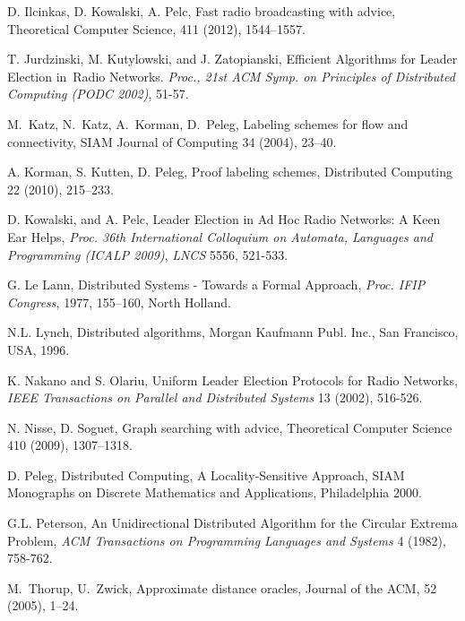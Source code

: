 \documentclass[11pt]{article}
\begin{document}
\begin{thebibliography}{12}
D. Ilcinkas, D. Kowalski, A. Pelc, 
Fast radio broadcasting with advice, 
 Theoretical Computer Science, 411 (2012),  1544--1557.
 
T. Jurdzinski, M. Kutylowski, and J. Zatopianski, 
Efficient Algorithms for Leader Election in~Radio Networks.
 {\em Proc., 21st ACM Symp. on Principles of Distributed Computing
(PODC 2002)}, 51-57.





M.~Katz, N.~Katz, A.~Korman, D.~Peleg, Labeling schemes for flow and
connectivity, 
SIAM Journal of  Computing 34 (2004), 23--40.



A. Korman, S. Kutten, D. Peleg, Proof labeling schemes,
Distributed Computing 22 (2010), 215--233.  

D. Kowalski, and A. Pelc, Leader Election in Ad Hoc Radio Networks: A Keen Ear Helps, 
{\em Proc. 36th International Colloquium on Automata, Languages and Programming (ICALP 2009)}, 
{\em LNCS} 5556, 521-533. 



G. Le Lann,
Distributed Systems - Towards a Formal Approach,
{\em Proc. IFIP Congress}, 1977, 155--160, North Holland.




N.L. Lynch, Distributed algorithms, Morgan Kaufmann Publ. Inc.,
San Francisco, USA, 1996.

K. Nakano and S. Olariu, Uniform Leader Election Protocols for Radio Networks,
{\em IEEE Transactions on Parallel and Distributed Systems} 13
(2002), 516-526.

N. Nisse, D. Soguet, Graph searching with advice,
Theoretical Computer Science 410 (2009), 1307--1318.



 D. Peleg,
  Distributed Computing, A Locality-Sensitive Approach,
  SIAM Monographs on Discrete Mathematics and Applications, Philadelphia 2000.
  
G.L. Peterson, An  Unidirectional Distributed Algorithm
for the Circular Extrema Problem,
{\em ACM Transactions on Programming Languages and Systems} 4 (1982), 758-762.








M.~Thorup, U.~Zwick, Approximate distance oracles,
Journal of the ACM, 52 (2005), 1--24.


\end{thebibliography}
\end{document}
